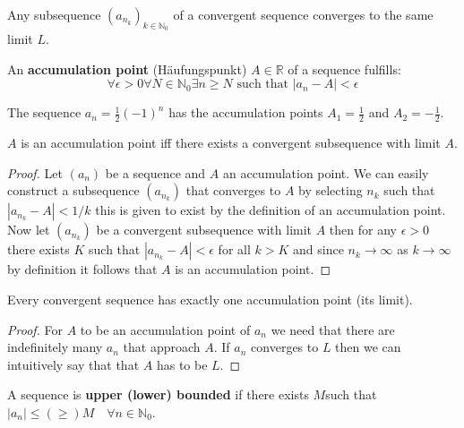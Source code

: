\begin{theorem}
    Any subsequence $(a_{n_k})_{k \in \mathbb{N}_0}$ of a convergent sequence converges to the same limit $L$.
\end{theorem}

\begin{definition}
    An \textbf{accumulation point} (Häufungspunkt) $A \in \mathbb{R}$ of a sequence fulfills:
    $$\forall \epsilon \gt 0 \forall N \in \mathbb{N}_0 \exists n \ge N \text{ such that } |a_n - A| \lt \epsilon$$
\end{definition}

\begin{example}
    The sequence $a_n = \frac{1}{2} (-1)^n$ has the accumulation points $A_1 = \frac{1}{2}$ and $A_2 = -\frac{1}{2}$.
\end{example}

\begin{theorem}
    $A$ is an accumulation point iff there exists a convergent subsequence with limit $A$.
\end{theorem}

\begin{proof}
    Let $(a_n)$ be a sequence and $A$ an accumulation point. We can easily construct a subsequence $(a_{n_k})$ that converges to $A$ by selecting $n_k$ such that $|a_{n_k} - A| < 1/k$ this is given to exist by the definition of an accumulation point.
    Now let $(a_{n_k})$ be a convergent subsequence with limit $A$ then for any $\epsilon > 0$ there exists $K$ such that $|a_{n_k} - A| < \epsilon$ for all $k > K$ and since $n_k \to \infty$ as $k \to \infty$ by definition it follows that $A$ is an accumulation point.
\end{proof}

\begin{theorem}
    Every convergent sequence has exactly one accumulation point (its limit).
\end{theorem}

\begin{proof}
    For $A$ to be an accumulation point of $a_n$ we need that there are indefinitely many $a_n$ that approach $A$. 
    If $a_n$ converges to $L$ then we can intuitively say that that $A$ has to be $L$.
\end{proof}

\begin{definition}
    A sequence is \textbf{upper (lower) bounded} if there exists $M$such that $|a_n| \le (\geq) M \quad \forall n \in \mathbb{N}_0$.
\end{definition}

